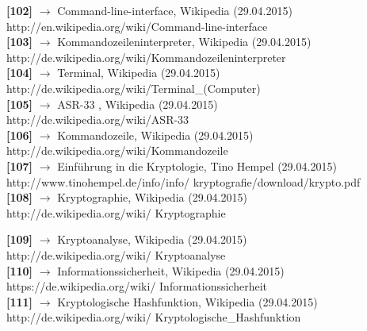 \documentclass[12pt,a4paper]{report}
\begin{document}
\begin{onehalfspace}
\noindent
\textbf{[102]} $\rightarrow$ Command-line-interface, Wikipedia (29.04.2015)\\
http://en.wikipedia.org/wiki/Command-line-interface\\

\noindent
\textbf{[103]} $\rightarrow$ Kommandozeileninterpreter, Wikipedia (29.04.2015)\\
http://de.wikipedia.org/wiki/Kommandozeileninterpreter\\

\noindent
\textbf{[104]} $\rightarrow$ Terminal, Wikipedia (29.04.2015)\\
http://de.wikipedia.org/wiki/Terminal\_(Computer)\\

\noindent
\textbf{[105]} $\rightarrow$ ASR-33 , Wikipedia (29.04.2015)\\
http://de.wikipedia.org/wiki/ASR-33\\

\noindent
\textbf{[106]} $\rightarrow$ Kommandozeile, Wikipedia (29.04.2015)\\
http://de.wikipedia.org/wiki/Kommandozeile\\

\noindent
\textbf{[107]} $\rightarrow$ Einführung in die
Kryptologie, Tino Hempel (29.04.2015)\\
http://www.tinohempel.de/info/info/ kryptografie/download/krypto.pdf\\

\noindent
\textbf{[108]} $\rightarrow$ Kryptographie, Wikipedia (29.04.2015)\\
http://de.wikipedia.org/wiki/ Kryptographie\\

\newpage

\noindent
\textbf{[109]} $\rightarrow$ Kryptoanalyse, Wikipedia (29.04.2015)\\
http://de.wikipedia.org/wiki/ Kryptoanalyse\\

\noindent
\textbf{[110]} $\rightarrow$ Informationssicherheit, Wikipedia (29.04.2015)\\
https://de.wikipedia.org/wiki/ Informationssicherheit\\

\noindent
\textbf{[111]} $\rightarrow$ Kryptologische Hashfunktion, Wikipedia (29.04.2015)\\
http://de.wikipedia.org/wiki/ Kryptologische\_Hashfunktion\\


\end{onehalfspace}
\end{document}
